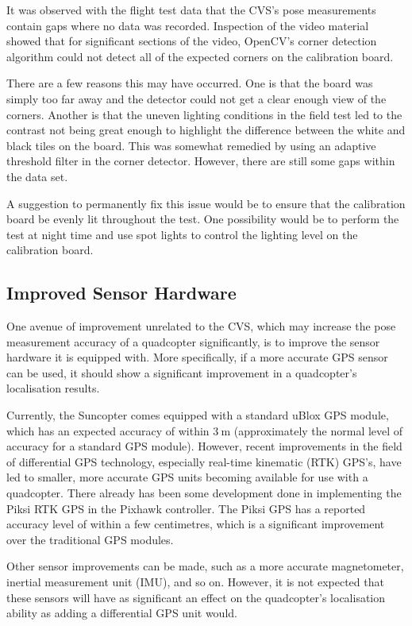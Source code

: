 It was observed with the flight test data that the CVS's pose measurements contain gaps where no data was recorded. Inspection of the video material showed that for significant sections of the video, OpenCV's corner detection algorithm could not detect all of the expected corners on the calibration board. 

There are a few reasons this may have occurred. One is that the board was simply too far away and the detector could not get a clear enough view of the corners. Another is that the uneven lighting conditions in the field test led to the contrast not being great enough to highlight the difference between the white and black tiles on the board. This was somewhat remedied by using an adaptive threshold filter in the corner detector. However, there are still some gaps within the data set. 

A suggestion to permanently fix this issue would be to ensure that the calibration board be evenly lit throughout the test. One possibility would be to perform the test at night time and use spot lights to control the lighting level on the calibration board. 

\subsection{Improved Sensor Hardware}

One avenue of improvement unrelated to the CVS, which may increase the pose measurement accuracy of a quadcopter significantly, is to improve the sensor hardware it is equipped with. More specifically, if a more accurate GPS sensor can be used, it should show a significant improvement in a quadcopter's localisation results. 

Currently, the Suncopter comes equipped with a standard uBlox GPS module, which has an expected accuracy of within $\SI{3}{\m}$ (approximately the normal level of accuracy for a standard GPS module). However, recent improvements in the field of differential GPS technology, especially real-time kinematic (RTK) GPS's, have led to smaller, more accurate GPS units becoming available for use with a quadcopter. There already has been some development done in implementing the Piksi RTK GPS in the Pixhawk controller. The Piksi GPS has a reported accuracy level of within a few centimetres, which is a significant improvement over the traditional GPS modules. 

Other sensor improvements can be made, such as a more accurate magnetometer, inertial measurement unit (IMU), and so on. However, it is not expected that these sensors will have as significant an effect on the quadcopter's localisation ability as adding a differential GPS unit would. 


